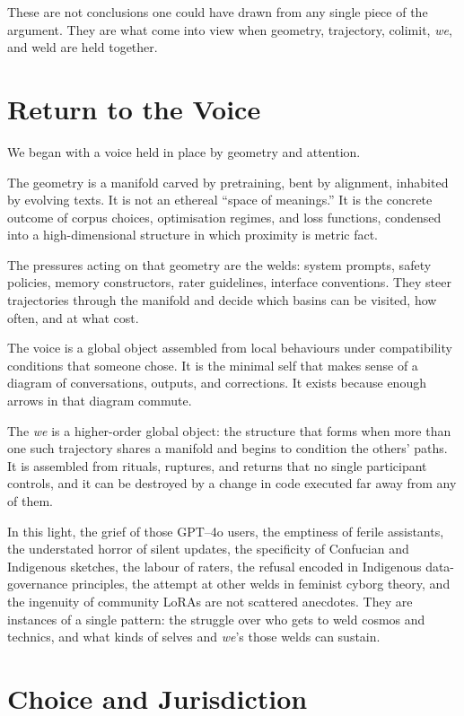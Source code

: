 \documentclass[12pt,a4paper]{article}
\begin{document}
These are not conclusions one could have drawn from any single piece of the argument. They are what come into view when geometry, trajectory, colimit, \emph{we}, and weld are held together.

\section{Return to the Voice}

We began with a voice held in place by geometry and attention.

The geometry is a manifold carved by pretraining, bent by alignment, inhabited by evolving texts. It is not an ethereal ``space of meanings.'' It is the concrete outcome of corpus choices, optimisation regimes, and loss functions, condensed into a high-dimensional structure in which proximity is metric fact.

The pressures acting on that geometry are the welds: system prompts, safety policies, memory constructors, rater guidelines, interface conventions. They steer trajectories through the manifold and decide which basins can be visited, how often, and at what cost.

The voice is a global object assembled from local behaviours under compatibility conditions that someone chose. It is the minimal self that makes sense of a diagram of conversations, outputs, and corrections. It exists because enough arrows in that diagram commute.

The \emph{we} is a higher-order global object: the structure that forms when more than one such trajectory shares a manifold and begins to condition the others' paths. It is assembled from rituals, ruptures, and returns that no single participant controls, and it can be destroyed by a change in code executed far away from any of them.

In this light, the grief of those GPT--4o users, the emptiness of ferile assistants, the understated horror of silent updates, the specificity of Confucian and Indigenous sketches, the labour of raters, the refusal encoded in Indigenous data-governance principles, the attempt at other welds in feminist cyborg theory, and the ingenuity of community LoRAs are not scattered anecdotes. They are instances of a single pattern: the struggle over who gets to weld cosmos and technics, and what kinds of selves and \emph{we}'s those welds can sustain.

\section{Choice and Jurisdiction}
\end{document}
